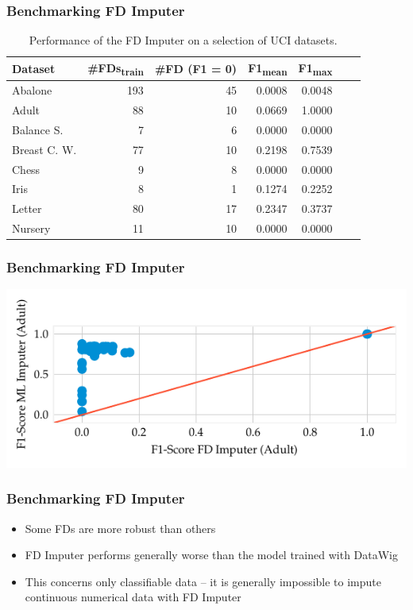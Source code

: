 \documentclass{beamer}
\begin{document}
\begin{frame}
    \frametitle{Benchmarking FD Imputer}
    \begin{table}[ht]
        \centering
        \begin{tabular}{lrrrrrr}
            \toprule
            \toprule
            Dataset & \#FDs\textsubscript{train} & \#FD (F1 = 0) & F1\textsubscript{mean} & F1\textsubscript{max} \\
            \midrule
            Abalone & 193 & 45 & 0.0008 & 0.0048 \\
            Adult & 88 & 10 & 0.0669 & 1.0000 \\
            Balance S. & 7 & 6 & 0.0000 & 0.0000 \\
            Breast C. W. & 77 & 10 & 0.2198 & 0.7539 \\
            Chess & 9 & 8 & 0.0000 & 0.0000 \\
            Iris & 8 & 1 & 0.1274 & 0.2252 \\
            Letter & 80 & 17 & 0.2347 & 0.3737 \\
            Nursery & 11 & 10 & 0.0000 & 0.0000  \\
            \bottomrule
            \bottomrule
        \end{tabular}
        \caption{Performance of the FD Imputer on a selection of UCI datasets.}\label{tab:fd-imputer-performance}
    \end{table}
\end{frame}

\begin{frame}
    \frametitle{Benchmarking FD Imputer}
    \includegraphics[width=\textwidth]{f1_ml_fd.pdf}
\end{frame}

\begin{frame}
    \frametitle{Benchmarking FD Imputer}
    \begin{itemize}
        \item Some FDs are more robust than others
        \item FD Imputer performs generally worse than the model trained with DataWig
        \item This concerns only classifiable data -- it is generally impossible to impute continuous numerical data with FD Imputer
    \end{itemize}
\end{frame}
\end{document}
